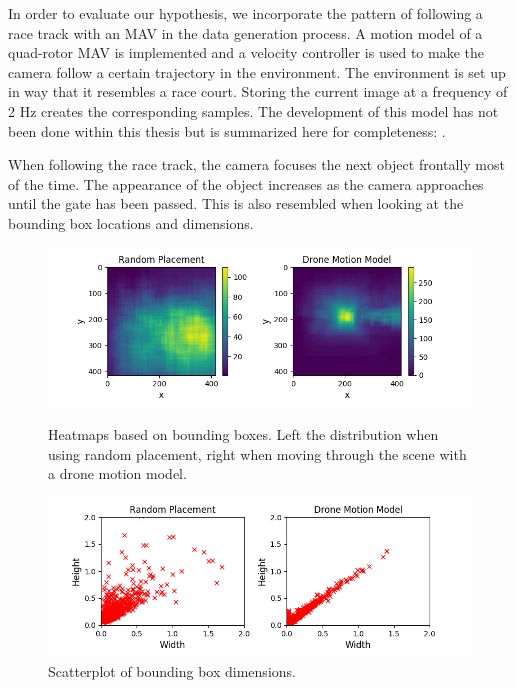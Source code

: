 In order to evaluate our hypothesis, we incorporate the pattern of following a race track with an \ac{MAV} in the data generation process. A motion model of a quad-rotor \ac{MAV} is implemented and a velocity controller is used to make the camera follow a certain trajectory in the environment. The environment is set up in way that it resembles a race court.  Storing the current image at a frequency of 2 Hz creates the corresponding samples. The development of this model has not been done within this thesis but is summarized here for completeness: . 

When following the race track, the camera focuses the next object frontally most of the time. The appearance of the object increases as the camera approaches until the gate has been passed. This is also resembled when looking at the bounding box locations and dimensions.

\begin{figure}
	\begin{minipage}{\textwidth}
		\includegraphics[width=\textwidth]{fig/heatmap_camplace}
		\caption{Heatmaps based on bounding boxes. Left the distribution when using random placement, right when moving through the scene with a drone motion model.}
		\label{fig:heatmap_camplace}
	\end{minipage}
	\begin{minipage}{\textwidth}
		\includegraphics[width=\textwidth]{fig/aspect_ratios_camplace}
		\caption{Scatterplot of bounding box dimensions.}
		\label{fig:scatter_camplace}
	\end{minipage}
\end{figure}

